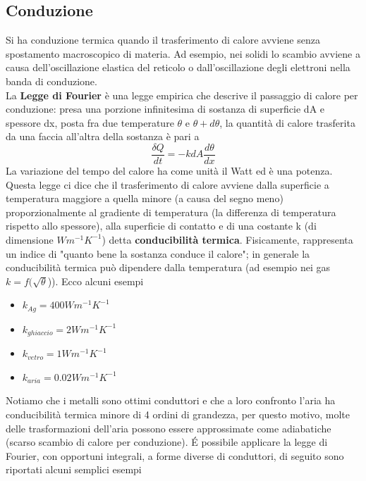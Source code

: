 \documentclass[10pt,a4paper]{article}
\begin{document}
\subsection{Conduzione}\label{sec:conduzione}
Si ha conduzione termica quando il trasferimento di calore avviene senza spostamento macroscopico di materia. Ad esempio, nei solidi lo scambio avviene a causa dell'oscillazione elastica del reticolo o dall'oscillazione degli elettroni nella banda di conduzione. \\
La \textbf{Legge di Fourier} è una legge empirica che descrive il passaggio di calore per conduzione: presa una porzione infinitesima di sostanza di superficie dA e spessore dx, posta fra due temperature $\theta$ e $\theta+d\theta$, la quantità di calore trasferita da una faccia all'altra della sostanza è pari a 
\[\frac{\delta Q}{dt}= - k dA \frac{d\theta}{dx}\]
La variazione del tempo del calore ha come unità il Watt ed è una potenza. Questa legge ci dice che il trasferimento di calore avviene dalla superficie a temperatura maggiore a quella minore (a causa del segno meno) proporzionalmente al gradiente di temperatura (la differenza di temperatura rispetto allo spessore), alla superficie di contatto e di una costante k (di dimensione \(W m^{-1} K^{-1}\)) detta \textbf{conducibilità termica}. Fisicamente, rappresenta un indice di "quanto bene la sostanza conduce il calore";  in generale la conducibilità termica può dipendere dalla temperatura (ad esempio nei gas $k = f(\sqrt{\theta}$)). Ecco alcuni esempi
\begin{itemize}
	\item $k_{Ag} = 400 W m^{-1} K^{-1}$
	\item $k_{ghiaccio} = 2 W m^{-1} K^{-1}$
	\item $k_{vetro} = 1 W m^{-1} K^{-1}$
	\item $k_{aria} = 0.02 W m^{-1} K^{-1}$
\end{itemize} 
Notiamo che i metalli sono ottimi conduttori e che a loro confronto l'aria ha conducibilità termica minore di 4 ordini di grandezza, per questo motivo, molte delle trasformazioni dell'aria possono essere approssimate come adiabatiche (scarso scambio di calore per conduzione). \'{E} possibile applicare la legge di Fourier, con opportuni integrali, a forme diverse di conduttori, di seguito sono riportati alcuni semplici esempi
\end{document}
